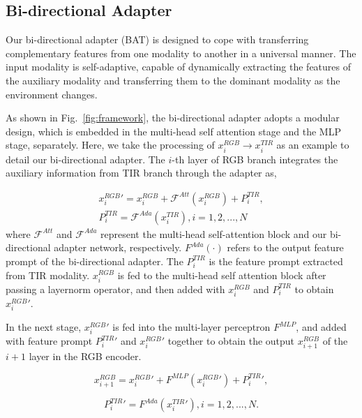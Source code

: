 \documentclass[letterpaper]{article} %
\begin{document}
\subsection{Bi-directional Adapter}

Our bi-directional adapter (BAT) is designed to cope with transferring complementary features from one modality to another in a universal manner.
The input modality is self-adaptive, capable of dynamically extracting the features of the auxiliary modality and transferring them to the dominant modality as the environment changes.

As shown in Fig.~\ref{fig:framework}, the bi-directional adapter adopts a modular design, which is embedded in the multi-head self attention stage and the MLP stage, separately. Here, we take the processing of $x_{i}^{RGB}\rightarrow x_{i}^{TIR}$ as an example to detail our bi-directional adapter. The $i$-th layer of RGB branch integrates the auxiliary information from TIR branch through the adapter as,

\begin{equation}
\begin{aligned}
   {x_{i}^{RGB}}' = x_{i}^{RGB} + \mathcal{F}^{Att}(x_{i}^{RGB}) + P_{i}^{TIR},\\
    P_{i}^{TIR} = \mathcal{F}^{Ada}(x_{i}^{TIR}),   i = 1,2,...,N
\end{aligned}
\end{equation}
where $\mathcal{F}^{Att}$ and $\mathcal{F}^{Ada}$ represent the multi-head self-attention block and our bi-directional adapter network, respectively. $F^{Ada}(\cdot)$ refers to the output feature prompt of the bi-directional adapter.
The $P_{i}^{TIR}$ is the feature prompt extracted from TIR modality.  $x_{i}^{RGB}$ is fed to the multi-head self attention block after passing a layernorm operator, and then added with $x_{i}^{RGB}$ and $P_{i}^{TIR}$ to obtain ${x_{i}^{RGB}}'$.

In the next stage, ${x_{i}^{RGB}}'$ is fed into the multi-layer perceptron $F^{MLP}$, and added with feature prompt ${P_{i}^{TIR}}'$ and ${x_{i}^{RGB}}'$ together to obtain the output $x_{i+1}^{RGB}$ of the $i+1$ layer in the RGB encoder.

\begin{equation}
     x_{i+1}^{RGB} = {x_{i}^{RGB}}' + F^{MLP}({x_{i}^{RGB}}') + {P_{i}^{TIR}}',
\end{equation}

\begin{equation}
    {P_{i}^{TIR}}' = F^{Ada}({x_{i}^{TIR}}'),   i = 1,2,...,N.
\end{equation}
\end{document}
